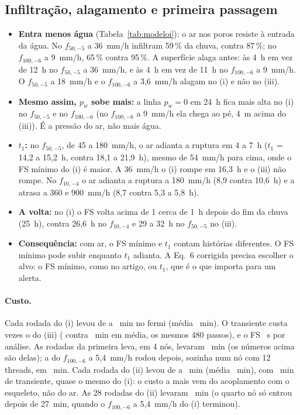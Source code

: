 \documentclass[11pt,a4paper]{article}
\begin{document}
\subsection{Infiltração, alagamento e primeira passagem}
\begin{itemize}
  \item \textbf{Entra menos água} (Tabela~\ref{tab:modeloi}): o ar nos poros resiste à entrada da água. No $f_{50,-5}$
    a 36~mm/h infiltram 59\,\% da chuva, contra 87\,\%; no $f_{100,-6}$ a 9~mm/h, 65\,\% contra 95\,\%. A superfície
    alaga antes: às 4~h em vez de 12~h no $f_{50,-5}$ a 36~mm/h, e às 4~h em vez de 11~h no $f_{100,-6}$ a 9~mm/h. O
    $f_{50,-5}$ a 18~mm/h e o $f_{100,-6}$ a 3,6~mm/h alagam no (i) e não no (iii).
  \item \textbf{Mesmo assim, $p_w$ sobe mais:} a linha $p_w = 0$ em 24~h fica mais alta no (i) no $f_{50,-5}$ e no
    $f_{100,-6}$ (no $f_{100,-6}$ a 9~mm/h ela chega ao pé, 4~m acima do (iii)). É a pressão do ar, não mais água.
  \item \textbf{$t_1$:} no $f_{50,-5}$, de 45 a 180~mm/h, o ar adianta a ruptura em 4 a 7~h ($t_1$ = 14,2 a 15,2~h,
    contra 18,1 a 21,9~h), mesmo de 54~mm/h para cima, onde o FS mínimo do (i) é maior. A 36~mm/h o (i) rompe em
    16,3~h e o (iii) não rompe. No $f_{10,-4}$ o ar adianta a ruptura a 180~mm/h (8,9
    contra 10,6~h) e a atrasa a 360 e 900~mm/h (8,7 contra 5,3 a 5,8~h).
  \item \textbf{A volta:} no (i) o FS volta acima de 1 cerca de 1~h depois do fim da chuva (25~h), contra 26,6~h no
    $f_{10,-4}$ e 29 a 32~h no $f_{50,-5}$ no (iii).
  \item \textbf{Consequência:} com ar, o FS mínimo e $t_1$ contam histórias diferentes. O FS mínimo pode subir enquanto
    $t_1$ adianta. A Eq.~6 corrigida precisa escolher o alvo: o FS mínimo, como no artigo, ou $t_1$, que é o que importa
    para um alerta.
\end{itemize}

\paragraph{Custo.} Cada rodada do (i) levou de \iCustoMin{} a \iCustoMax~min no fermi (média \iCustoMedio~min). O
transiente custa \iTransRazao{} vezes o do (iii) (\iTrans{} contra \iiiTrans~min em média, os mesmos 480 passos), e o FS
\iFator~s por análise. As \iLeva{} rodadas da primeira leva, em 4 nós, levaram \iCampanha~min (os números acima são
delas); a do $f_{100,-6}$ a 5,4~mm/h rodou depois, sozinha num nó com 12 threads, em \iRefeita~min. Cada rodada do (ii)
levou de \iiCustoMin{} a \iiCustoMax~min (média \iiCustoMedio~min), com \iiTrans~min de transiente, quase o mesmo do
(i): o custo a mais vem do acoplamento com o esqueleto, não do ar. As 28 rodadas do (ii) levaram \iiCampanha~min (o
quarto nó só entrou depois de 27~min, quando o $f_{100,-6}$ a 5,4~mm/h do (i) terminou).
\end{document}
